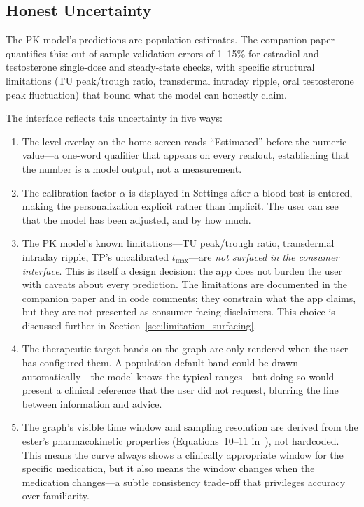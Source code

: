 \documentclass[11pt,a4paper]{article}
\begin{document}
\subsection{Honest Uncertainty}
\label{sec:uncertainty}

The PK model's predictions are population estimates. The companion
paper~\cite{xtpk} quantifies this: out-of-sample validation errors of
1--15\% for estradiol and testosterone single-dose and steady-state
checks, with specific structural limitations (TU peak/trough ratio,
transdermal intraday ripple, oral testosterone peak fluctuation) that
bound what the model can honestly claim.

The interface reflects this uncertainty in five ways:

\begin{enumerate}[nosep,leftmargin=1.4em]
\item The level overlay on the home screen reads ``Estimated'' before the
  numeric value---a one-word qualifier that appears on every readout,
  establishing that the number is a model output, not a measurement.
\item The calibration factor $\alpha$ is displayed in Settings after a
  blood test is entered, making the personalization explicit rather than
  implicit. The user can see that the model has been adjusted, and by how
  much.
\item The PK model's known limitations---TU peak/trough ratio,
  transdermal intraday ripple, TP's uncalibrated $t_{\max}$---are
  \emph{not surfaced in the consumer interface}. This is itself a design
  decision: the app does not burden the user with caveats about every
  prediction. The limitations are documented in the companion paper and
  in code comments; they constrain what the app claims, but they are not
  presented as consumer-facing disclaimers. This choice is discussed
  further in Section~\ref{sec:limitation_surfacing}.
\item The therapeutic target bands on the graph are only rendered when the
  user has configured them. A population-default band could be drawn
  automatically---the model knows the typical ranges---but doing so would
  present a clinical reference that the user did not request, blurring
  the line between information and advice.
\item The graph's visible time window and sampling resolution are derived
  from the ester's pharmacokinetic properties
  (Equations~10--11 in~\cite{xtpk}), not hardcoded. This means the curve
  always shows a clinically appropriate window for the specific
  medication, but it also means the window changes when the medication
  changes---a subtle consistency trade-off that privileges accuracy over
  familiarity.
\end{enumerate}
\end{document}
